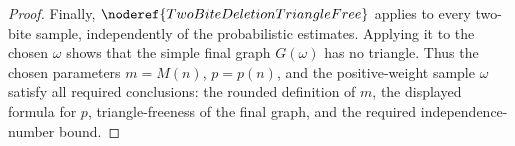 \begin{proof}
Finally, \(\noderef{TwoBiteDeletionTriangleFree}\) applies to every two-bite
sample, independently of the probabilistic estimates.  Applying it to the
chosen \(\omega\) shows that the simple final graph \(G(\omega)\) has no
triangle.  Thus the chosen parameters \(m=M(n)\), \(p=p(n)\), and the
positive-weight sample \(\omega\) satisfy all required conclusions:
the rounded definition of \(m\), the displayed formula for \(p\),
triangle-freeness of the final graph, and the required independence-number
bound.
\end{proof}
